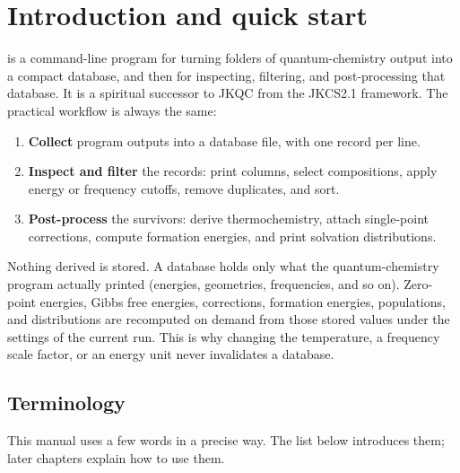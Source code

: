 \section{Introduction and quick start}\label{sec:introduction}

\CJKQC{} is a command-line program for turning folders of
quantum-chemistry output into a compact database, and then for inspecting,
filtering, and post-processing that database. It is a spiritual successor to JKQC from
the JKCS2.1 framework. The practical workflow is always the same:

\begin{enumerate}
  \item \textbf{Collect} program outputs into a database file, with one
        record per line.
  \item \textbf{Inspect and filter} the records: print columns, select
        compositions, apply energy or frequency cutoffs, remove duplicates,
        and sort.
  \item \textbf{Post-process} the survivors: derive thermochemistry,
        attach single-point corrections, compute formation energies, and
        print solvation distributions.
\end{enumerate}

Nothing derived is stored. A database holds only what the quantum-chemistry
program actually printed (energies, geometries, frequencies, and so on).
Zero-point energies, Gibbs free energies, corrections, formation energies,
populations, and distributions are recomputed on demand from those
stored values under the settings of the current run. This is why changing the
temperature, a frequency scale factor, or an energy unit never invalidates a
database.

\subsection{Terminology}\label{sec:terminology}

This manual uses a few words in a precise way. The list below introduces them;
later chapters explain how to use them.

